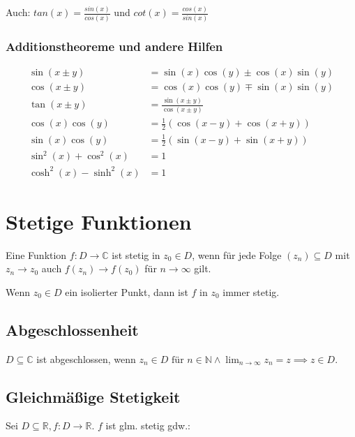 Auch: $tan(x) = \frac{sin(x)}{cos(x)}$ und $cot(x) = \frac{cos(x)}{sin(x)}$

\subsubsection*{Additionstheoreme und andere Hilfen}

\vspace*{-3mm}
\begin{align*}
	\sin(x\pm y)            &= \sin(x) \cos(y) \pm \cos(x) \sin(y) \\
	\cos(x\pm y)            &= \cos(x) \cos(y) \mp \sin(x) \sin(y) \\
	\tan(x\pm y)            &= \textstyle\frac{\sin(x\pm y)}{\cos(x\pm y)} \\
	\cos(x) \cos(y)         &= \textstyle\frac{1}{2} ( \cos(x-y) + \cos(x+y) ) \\
	\sin(x) \cos(y)         &= \textstyle\frac{1}{2} ( \sin(x-y) + \sin(x+y) ) \\
	\sin^2(x) + \cos^2(x)   &= 1 \\
	\cosh^2(x) - \sinh^2(x) &= 1
\end{align*}


\section*{Stetige Funktionen}

Eine Funktion $f : D \rightarrow \mathbb{C}$ ist stetig in $z_0 \in D$, wenn für jede Folge $(z_n) \subseteq D$ mit $z_n \rightarrow z_0$ auch $f(z_n) \rightarrow f(z_0)$ für $n \rightarrow \infty$ gilt.

Wenn $z_0 \in D$ ein isolierter Punkt, dann ist $f$ in $z_0$ immer stetig.

\subsection*{Abgeschlossenheit}

$D \subseteq \mathbb{C}$ ist abgeschlossen, wenn $z_n \in D \text{ für } n \in \mathbb{N} \land \lim_{n \to \infty} z_n = z \implies z \in D$.

\subsection*{Gleichmäßige Stetigkeit}

Sei $D \subseteq \mathbb{R}, f : D \rightarrow \mathbb{R}$. $f$ ist glm. stetig gdw.:

